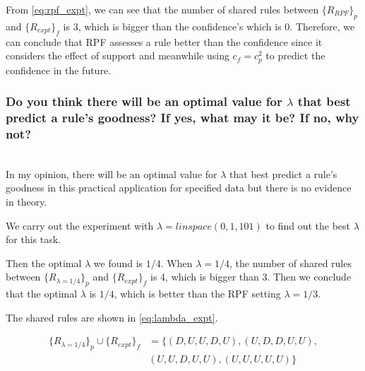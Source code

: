 \documentclass[runningheads]{llncs}
\begin{document}
From \eqref{eq:rpf_expt}, we can see that the number of shared rules between $\{R_{RPF}\}_p$ and $\{R_{expt}\}_f$ is 3, which is bigger than the confidence's which is 0. 
Therefore, we can conclude that RPF assesses a rule better than the confidence since it considers the effect of support and meanwhile using $c_f=c_p^2$ to predict the confidence in the future.


\subsubsection*{Do you think there will be an optimal value for $\lambda$ that best predict a rule's goodness? If yes, what may it be? If no, why not?}

\hfill\\
In my opinion, there will be an optimal value for $\lambda$ that best predict a rule's goodness in this practical application for specified data but there is no evidence in theory.

We carry out the experiment with $\lambda=linspace(0,1,101)$ to find out the best $\lambda$ for this task.

Then the optimal $\lambda$ we found is $1/4$. When $\lambda=1/4$, the number of shared rules between $\{R_{\lambda=1/4}\}_p$ and $\{R_{expt}\}_f$ is 4, which is bigger than 3. 
Then we conclude that the optimal $\lambda$ is $1/4$, which is better than the RPF setting $\lambda=1/3$.

The shared rules are shown in \eqref{eq:lambda_expt}.

\begin{equation}
    \label{eq:lambda_expt}
    \begin{aligned}
        \{R_{\lambda=1/4}\}_p\cup \{R_{expt}\}_f & = \{(D,U,U,D,U),(U,D,D,U,U),\\
        &(U,U,D,U,U),(U,U,U,U,U)\}
    \end{aligned}
\end{equation}



\end{document}
